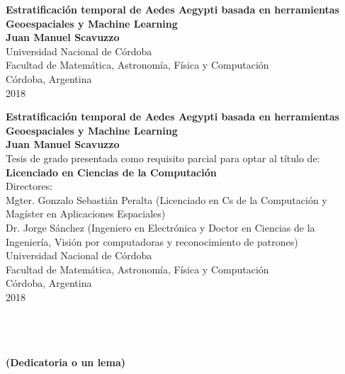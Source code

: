 \begin{center}
\begin{figure}
\centering%
%
\end{figure}
\thispagestyle{empty} \vspace*{0.1cm} \textbf{\huge
Estratificación temporal de Aedes Aegypti basada en herramientas Geoespaciales y Machine Learning}\\[9.0cm]
\Large\textbf{Juan Manuel Scavuzzo}\\[0.5cm]
\small Universidad Nacional de Córdoba\\
Facultad de Matemática, Astronomía, Física y Computación\\
Córdoba, Argentina\\
2018\\
\end{center}

\newpage{\pagestyle{empty}\cleardoublepage}

\newpage
\begin{center}
\thispagestyle{empty} \vspace*{0cm} \textbf{\huge
Estratificación temporal de Aedes Aegypti basada en herramientas Geoespaciales y Machine Learning}\\[3.0cm]
\Large\textbf{Juan Manuel Scavuzzo}\\[2.0cm]
\small Tesis de grado presentada como requisito parcial para optar al
título de:\\
\textbf{Licenciado en Ciencias de la Computación}\\[2.5cm]
Directores:\\

Mgter. Gonzalo Sebastián Peralta (Licenciado en Cs de la Computación y Magíster en Aplicaciones Espaciales)\\
Dr. Jorge Sánchez (Ingeniero en Electrónica y Doctor en Ciencias de la Ingeniería, Visión por computadoras y reconocimiento de patrones)\\ [3.0cm]

Universidad Nacional de Córdoba\\
Facultad de Matemática, Astronomía, Física y Computación\\
Córdoba, Argentina\\
2018\\\end{center}

\newpage{\pagestyle{empty}\cleardoublepage}

\newpage
\thispagestyle{empty} \textbf{}\normalsize
\\\\\\%
\textbf{(Dedicatoria o un lema)}\\[4.0cm]

